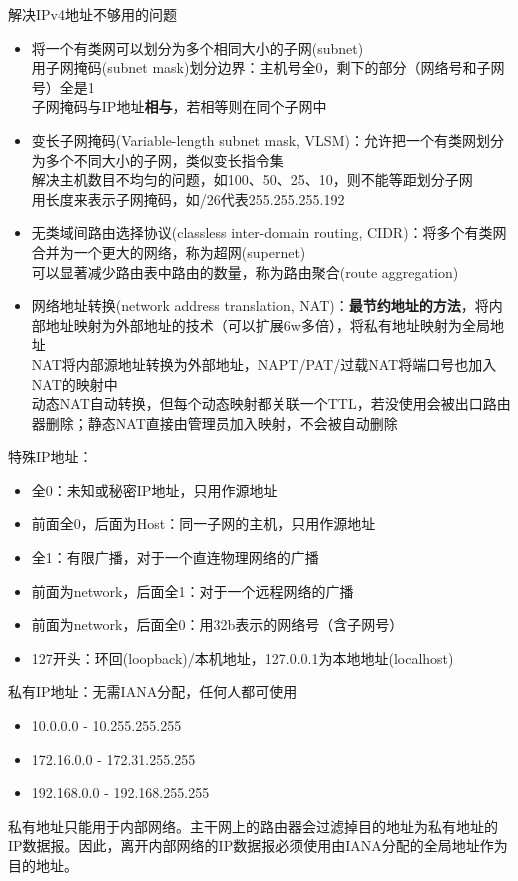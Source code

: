 解决IPv4地址不够用的问题
\begin{itemize}
	\item 将一个有类网可以划分为多个相同大小的子网(subnet)\\
用子网掩码(subnet mask)划分边界：主机号全0，剩下的部分（网络号和子网号）全是1\\
子网掩码与IP地址\textbf{相与}，若相等则在同个子网中
	\item 变长子网掩码(Variable-length subnet mask, VLSM)：允许把一个有类网划分为多个不同大小的子网，类似变长指令集\\
解决主机数目不均匀的问题，如100、50、25、10，则不能等距划分子网\\
用长度来表示子网掩码，如/26代表255.255.255.192
	\item 无类域间路由选择协议(classless inter-domain routing, CIDR)：将多个有类网合并为一个更大的网络，称为超网(supernet)\\
可以显著减少路由表中路由的数量，称为路由聚合(route aggregation)
	\item 网络地址转换(network address translation, NAT)：\textbf{最节约地址的方法}，将内部地址映射为外部地址的技术（可以扩展6w多倍），将私有地址映射为全局地址\\
NAT将内部源地址转换为外部地址，NAPT/PAT/过载NAT将端口号也加入NAT的映射中\\
动态NAT自动转换，但每个动态映射都关联一个TTL，若没使用会被出口路由器删除；静态NAT直接由管理员加入映射，不会被自动删除
\end{itemize}

特殊IP地址：
\begin{itemize}
	\item 全0：未知或秘密IP地址，只用作源地址
	\item 前面全0，后面为Host：同一子网的主机，只用作源地址
	\item 全1：有限广播，对于一个直连物理网络的广播
	\item 前面为network，后面全1：对于一个远程网络的广播
	\item 前面为network，后面全0：用32b表示的网络号（含子网号）
	\item 127开头：环回(loopback)/本机地址，127.0.0.1为本地地址(localhost)
\end{itemize}

私有IP地址：无需IANA分配，任何人都可使用
\begin{itemize}
	\item 10.0.0.0 - 10.255.255.255
	\item 172.16.0.0 - 172.31.255.255
	\item 192.168.0.0 - 192.168.255.255
\end{itemize}
私有地址只能用于内部网络。主干网上的路由器会过滤掉目的地址为私有地址的IP数据报。因此，离开内部网络的IP数据报必须使用由IANA分配的全局地址作为目的地址。

